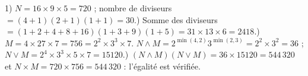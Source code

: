1) $N=16\times9\times5=720$ ; nombre de diviseurs $=(4{+}1)(2{+}1)(1{+}1)=30$.) Somme des diviseurs $=(1+2+4+8+16)(1+3+9)(1+5)=31\times13\times6=2418$.) $M=4\times27\times7=756=2^2\times3^3\times7$. $N\wedge M=2^{\min(4,2)}3^{\min(2,3)}=2^2\times3^2=36$ ; $N\vee M=2^4\times3^3\times5\times7=15120$.) $(N\wedge M)(N\vee M)=36\times15120=544\,320$ et $N\times M=720\times756=544\,320$ : l'égalité est vérifiée.
